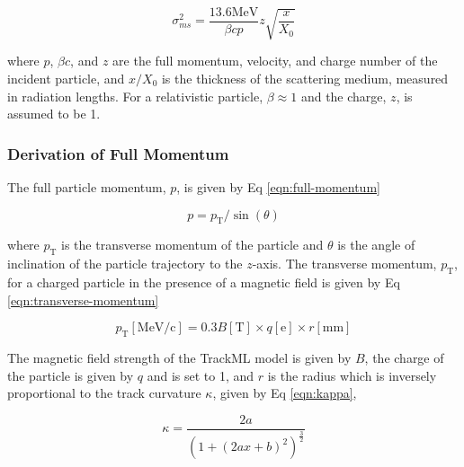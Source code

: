 
\begin{equation}
    \sigma_{ms}^{2} = \frac{13.6 \text{MeV}}{\beta c p} z \sqrt{\frac{x}{X_0}}
    \label{eqn:simplified-moliere-equation}
\end{equation}

where $p$, $\beta c$, and $z$ are the full momentum, velocity, and charge number of the incident particle, and $x/X_0$ is the thickness of the scattering medium, measured in radiation lengths. For a relativistic particle, $\beta \approx 1$ and the charge, $z$, is assumed to be 1. 




\subsubsection{Derivation of Full Momentum}

The full particle momentum, $p$, is given by Eq \eqref{eqn:full-momentum}

\begin{equation}
    p = p_\text{T} / \sin(\theta)
    \label{eqn:full-momentum}
\end{equation}

where $p_\text{T}$ is the transverse momentum of the particle and $\theta$ is the angle of inclination of the particle trajectory to the $z$-axis. The transverse momentum, $p_\text{T}$, for a charged particle in the presence of a magnetic field is given by Eq \eqref{eqn:transverse-momentum}

\begin{equation}
    p_\text{T} [\text{MeV/c}] = 0.3 B [\text{T}] \times q [\text{e}] \times r [\text{mm}]
    \label{eqn:transverse-momentum}
\end{equation}

The magnetic field strength of the TrackML model is given by $B$, the charge of the particle is given by $q$ and is set to 1, and $r$ is the radius which is inversely proportional to the track curvature $\kappa$, given by Eq \eqref{eqn:kappa}, 

\begin{equation}
\kappa = \frac{2a}{(1 + (2ax + b)^2)^{\frac{3}{2}}}
\label{eqn:kappa}
\end{equation}


